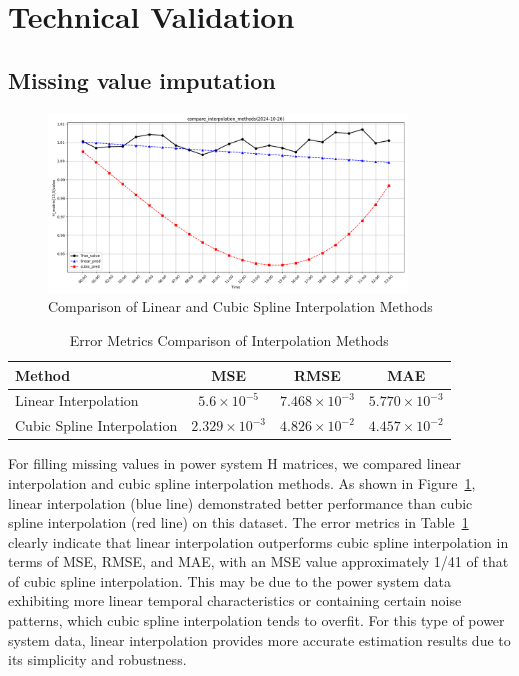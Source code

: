 \documentclass[12pt]{article}
\begin{document}

\newpage
\section*{Technical Validation}
\subsection*{Missing value imputation}
\begin{figure}[htbp]
    \centering
    \includegraphics[width=0.85\textwidth]{picture/interpolation.png}
    \caption{Comparison of Linear and Cubic Spline Interpolation Methods}
    \label{fig:interpolation_comparison_en}
\end{figure}

\begin{table}[htbp]
    \centering
    
    \label{tab:interpolation_errors_en}
    \begin{tabular}{lccc}
        \toprule
        \textbf{Method} & \textbf{MSE} & \textbf{RMSE} & \textbf{MAE} \\
        \midrule
        Linear Interpolation & $5.6 \times 10^{-5}$ & $7.468 \times 10^{-3}$ & $5.770 \times 10^{-3}$ \\
        Cubic Spline Interpolation & $2.329 \times 10^{-3}$ & $4.826 \times 10^{-2}$ & $4.457 \times 10^{-2}$ \\
        \bottomrule
    \end{tabular}
    \caption{Error Metrics Comparison of Interpolation Methods}
\end{table}

For filling missing values in power system H matrices, we compared linear interpolation and cubic spline interpolation methods. As shown in Figure~\ref{fig:interpolation_comparison_en}, linear interpolation (blue line) demonstrated better performance than cubic spline interpolation (red line) on this dataset. The error metrics in Table~\ref{tab:interpolation_errors_en} clearly indicate that linear interpolation outperforms cubic spline interpolation in terms of MSE, RMSE, and MAE, with an MSE value approximately 1/41 of that of cubic spline interpolation. This may be due to the power system data exhibiting more linear temporal characteristics or containing certain noise patterns, which cubic spline interpolation tends to overfit. For this type of power system data, linear interpolation provides more accurate estimation results due to its simplicity and robustness.
\end{document}
